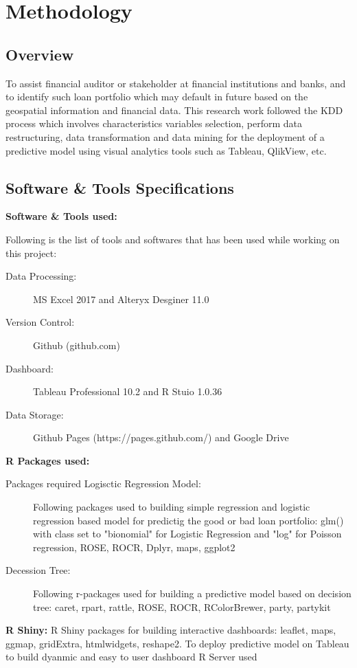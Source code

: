%
%
%
%

\chapter{Methodology}\label{C.Methodology}

\section{Overview}\label{S.Ch4.opening}
To assist financial auditor or stakeholder at financial institutions and banks, and to identify such loan portfolio which may default in future based on the geospatial information and financial data. This research work followed the KDD process which involves characteristics variables selection, perform data restructuring, data transformation and data mining for the deployment of a predictive model using visual analytics tools such as Tableau, QlikView, etc.
\section{Software \& Tools Specifications}\label{ch4.2}

\textbf{Software \& Tools used:}

Following is the list of tools and softwares that has been used while working on this project:
\begin{description}
  \item[Data Processing:] MS Excel 2017 and Alteryx Desginer 11.0
  \item[Version Control:] Github (github.com)
  \item[Dashboard:] Tableau Professional 10.2 and R Stuio 1.0.36
  \item[Data Storage:] Github Pages (https://pages.github.com/) and Google Drive
\end{description}
\textbf{R Packages used:}
\begin{description}
  \item[Packages required Logisctic Regression Model:] Following packages used to building simple regression and logistic regression based model for predictig the good or bad loan portfolio: glm() with class set to "bionomial" for Logistic Regression and "log" for Poisson regression, ROSE, ROCR, Dplyr, maps, ggplot2
  \item[Decession Tree:] Following r-packages used for building a predictive model based on decision tree: caret, rpart, rattle, ROSE, ROCR, RColorBrewer, party, partykit
\end{description}
\textbf{R Shiny:} R Shiny packages for building interactive dashboards: leaflet, maps, ggmap, gridExtra, htmlwidgets, reshape2. To deploy predictive model on Tableau to build dyanmic and easy to user dashboard R Server used


